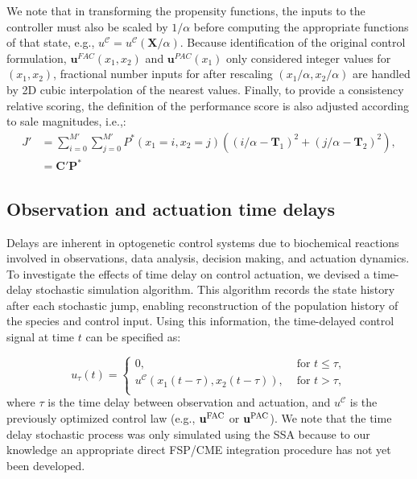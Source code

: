 \documentclass[12pt]{article}
\begin{document}
We note that in transforming the propensity functions, the inputs to the controller must also be scaled by $1/\alpha$ before computing the appropriate functions of that state, e.g., ${u}^{\mathcal{C}} = {u}^{\mathcal{C}}(\mathbf{X}/\alpha)$. Because identification of the original control formulation, $\mathbf{u}^{FAC}(x_1,x_2)$ and $\mathbf{u}^{PAC}(x_1)$ only considered integer values for $(x_1,x_2)$, fractional number inputs for after rescaling $(x_1/\alpha,x_2/\alpha)$ are handled by 2D cubic interpolation of the nearest values.
Finally, to provide a consistency relative scoring, the definition of the performance score is also adjusted according to sale magnitudes, i.e.,:
{\begin{align}
J' &= \sum_{i=0}^{M'}  \sum_{j=0}^{M'}P^*(x_1=i,x_2=j) ((i/\alpha - \mathbf T_1)^2 + (j/\alpha -\mathbf T_2)^2),\nonumber \\
& =\mathbf{C}'\mathbf{P}^*
\label{EuclidV}
\end{align}}

\subsection{Observation and actuation time delays}

Delays are inherent in optogenetic control systems due to biochemical reactions involved in observations, data analysis, decision making, and actuation dynamics. To investigate the effects of time delay on control actuation, we devised a time-delay stochastic simulation algorithm. This algorithm records the state history after each stochastic jump, enabling reconstruction of the population history of the species and control input.  Using this information, the time-delayed control signal at time $t$ can be specified as: 

\begin{equation}
u_{\tau}(t)=\left\{
\begin{array}{rl}
      0 ,&\text{ for }  t \leq \tau, \\
      {u}^{\mathcal{C}}(x_1(t-\tau), x_2(t-\tau)) , &\text{ for }   t > \tau,\\
\end{array}\right. 
\label{timeDelaySSA}
\end{equation}
where $\tau$ is the time delay between observation and actuation, and ${u}^{\mathcal{C}}$ is the previously optimized control law (e.g., $\mathbf{u}^{\rm FAC}$ or $\mathbf{u}^{\rm PAC}$). We note that the time delay stochastic process was only simulated using the SSA because to our knowledge an appropriate direct FSP/CME integration procedure has not yet been developed.
\end{document}
